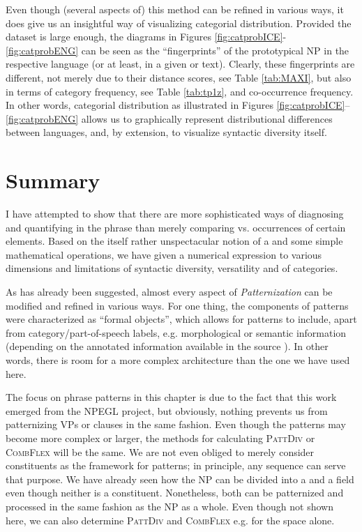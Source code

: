 \documentclass[output=paper,colorlinks,citecolor=brown,draft]{langscibook}
\begin{document}
Even though (several aspects of) this method can  be refined in various ways, it does give us an insightful way of visualizing categorial distribution. Provided the dataset is large enough, the diagrams in Figures \ref{fig:catprobICE}-\ref{fig:catprobENG} can be seen as the ``fingerprints'' of the prototypical NP in the respective language (or at least, in a given  or text).  Clearly, these fingerprints are different, not merely due to their distance scores, see Table \ref{tab:MAXI}, but also in terms of category frequency, see Table \ref{tab:tp1z}, and co-occurrence frequency. In other words, categorial distribution as illustrated  in Figures \ref{fig:catprobICE}--\ref{fig:catprobENG} allows us to graphically represent distributional differences between languages, and, by extension, to visualize syntactic diversity itself.




\section{Summary}
\label{sec:SUM}

I have attempted to show that there are more sophisticated ways of diagnosing and quantifying   in the  phrase than merely comparing  vs.  occurrences of certain elements. Based on the itself rather unspectacular notion of a  and some simple mathematical operations, we have given a numerical expression to various dimensions and limitations of syntactic diversity, versatility and  of categories. %

As has already been suggested, almost every aspect of \textit{Patternization} can be modified and refined in various ways. For one thing, the components of patterns were characterized as ``formal objects'', which allows for patterns to include, apart from category/part-of-speech labels, e.g. morphological or semantic information (depending on the annotated information available in the source ). In other words, there is room for a more complex  architecture than the one we have used here. 

The focus on  phrase patterns in this chapter is due to the fact that this work emerged from the NPEGL project, but obviously, nothing prevents us from patternizing VPs or clauses in the same fashion. Even though the patterns may become more complex or larger, the methods for calculating \textsc{PattDiv} or \textsc{CombFlex} will be the same.  
We are not even obliged to merely consider constituents as the framework for patterns; in principle, any sequence can serve that purpose. We have already seen how the NP can be divided into a  and a  field even though neither is a constituent. Nonetheless, both can be patternized and processed in the same fashion as the NP as a whole. Even though not shown here, we can also determine \textsc{PattDiv} and \textsc{CombFlex} e.g. for the  space alone. 
\end{document}
